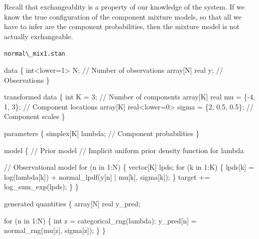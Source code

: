 \documentclass[
  letterpaper,
  DIV=11,
  numbers=noendperiod]{scrartcl}
\newenvironment{Shaded}{\begin{snugshade}}{\end{snugshade}}
\newcommand{\CommentTok}[1]{\textcolor[rgb]{0.37,0.37,0.37}{#1}}
\newcommand{\ControlFlowTok}[1]{\textcolor[rgb]{0.00,0.23,0.31}{#1}}
\newcommand{\DataTypeTok}[1]{\textcolor[rgb]{0.68,0.00,0.00}{#1}}
\newcommand{\DecValTok}[1]{\textcolor[rgb]{0.68,0.00,0.00}{#1}}
\newcommand{\FloatTok}[1]{\textcolor[rgb]{0.68,0.00,0.00}{#1}}
\newcommand{\KeywordTok}[1]{\textcolor[rgb]{0.00,0.23,0.31}{#1}}
\newcommand{\NormalTok}[1]{\textcolor[rgb]{0.00,0.23,0.31}{#1}}
\begin{document}
Recall that exchangeablity is a property of our knowledge of the system.
If we know the true configuration of the component mixture models, so
that all we have to infer are the component probabilities, then the
mixture model is not actually exchangeable.

\begin{codelisting}

\caption{\texttt{normal\textbackslash\_mix1.stan}}

\begin{Shaded}
\begin{Highlighting}[]
\KeywordTok{data}\NormalTok{ \{}
  \DataTypeTok{int}\NormalTok{\textless{}}\KeywordTok{lower}\NormalTok{=}\DecValTok{1}\NormalTok{\textgreater{} N;  }\CommentTok{// Number of observations}
  \DataTypeTok{array}\NormalTok{[N] }\DataTypeTok{real}\NormalTok{ y; }\CommentTok{// Observations}
\NormalTok{\}}

\KeywordTok{transformed data}\NormalTok{ \{}
  \DataTypeTok{int}\NormalTok{ K = }\DecValTok{3}\NormalTok{;                                    }\CommentTok{// Number of components}
  \DataTypeTok{array}\NormalTok{[K] }\DataTypeTok{real}\NormalTok{ mu = \{{-}}\DecValTok{4}\NormalTok{, }\DecValTok{1}\NormalTok{, }\DecValTok{3}\NormalTok{\};                }\CommentTok{// Component locations}
  \DataTypeTok{array}\NormalTok{[K] }\DataTypeTok{real}\NormalTok{\textless{}}\KeywordTok{lower}\NormalTok{=}\DecValTok{0}\NormalTok{\textgreater{} sigma = \{}\DecValTok{2}\NormalTok{, }\FloatTok{0.5}\NormalTok{, }\FloatTok{0.5}\NormalTok{\}; }\CommentTok{// Component scales}
\NormalTok{\}}

\KeywordTok{parameters}\NormalTok{ \{}
  \DataTypeTok{simplex}\NormalTok{[K] lambda; }\CommentTok{// Component probabilities}
\NormalTok{\}}

\KeywordTok{model}\NormalTok{ \{}
  \CommentTok{// Prior model}
  \CommentTok{// Implicit uniform prior density function for lambda}

  \CommentTok{// Observational model}
  \ControlFlowTok{for}\NormalTok{ (n }\ControlFlowTok{in} \DecValTok{1}\NormalTok{:N) \{}
    \DataTypeTok{vector}\NormalTok{[K] lpds;}
    \ControlFlowTok{for}\NormalTok{ (k }\ControlFlowTok{in} \DecValTok{1}\NormalTok{:K) \{}
\NormalTok{      lpds[k] = log(lambda[k]) + normal\_lpdf(y[n] | mu[k], sigma[k]);}
\NormalTok{    \}}
    \KeywordTok{target +=}\NormalTok{ log\_sum\_exp(lpds);}
\NormalTok{  \}}
\NormalTok{\}}

\KeywordTok{generated quantities}\NormalTok{ \{}
  \DataTypeTok{array}\NormalTok{[N] }\DataTypeTok{real}\NormalTok{ y\_pred;}

  \ControlFlowTok{for}\NormalTok{ (n }\ControlFlowTok{in} \DecValTok{1}\NormalTok{:N) \{}
    \DataTypeTok{int}\NormalTok{ z = categorical\_rng(lambda);}
\NormalTok{    y\_pred[n] = normal\_rng(mu[z], sigma[z]);}
\NormalTok{  \}}
\NormalTok{\}}
\end{Highlighting}
\end{Shaded}

\end{codelisting}
\end{document}
